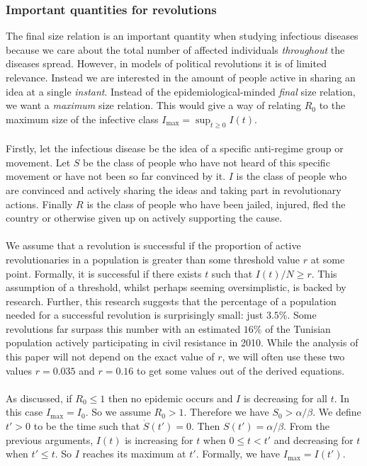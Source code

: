 \subsubsection{Important quantities for revolutions}
The final size relation is an important quantity when studying infectious diseases because we care about the total number of affected individuals \textit{throughout} the diseases spread. However, in models of political revolutions it is of limited relevance. Instead we are interested in the amount of people active in sharing an idea at a single \textit{instant}. Instead of the epidemiological-minded \textit{final} size relation, we want a \textit{maximum} size relation. This would give a way of relating $R_0$ to the maximum size of the infective class $I_{\max}=\sup_{t\geq0}I(t)$.\\
\\
Firstly, let the infectious disease be the idea of a specific anti-regime group or movement. Let $S$ be the class of people who have not heard of this specific movement or have not been so far convinced by it. $I$ is the class of people who are convinced and actively sharing the ideas and taking part in revolutionary actions. Finally $R$ is the class of people who have been jailed, injured, fled the country or otherwise given up on actively supporting the cause.\\
\\
We assume that a revolution is successful if the proportion of active revolutionaries in a population is greater than some threshold value $r$ at some point. Formally, it is successful if there exists $t$ such that ${I(t)}/{N}\geq r$. This assumption of a threshold, whilst perhaps seeming oversimplistic, is backed by research\cite{logic-non-violence}. Further, this research suggests that the percentage of a population needed for a successful revolution is surprisingly small: just $3.5\%$\cite{logic-non-violence}. Some revolutions far surpass this number with an estimated $16\%$ of the Tunisian population actively participating in civil resistance in 2010\cite{arab-spring-percent}. While the analysis of this paper will not depend on the exact value of $r$, we will often use these two values $r=0.035$ and $r=0.16$ to get some values out of the derived equations.\\
\\
As discussed, if $R_0\leq 1$ then no epidemic occurs and $I$ is decreasing for all $t$. In this case $I_{\max}=I_0$. So we assume $R_0>1$. Therefore we have $S_0>\alpha/\beta$. We define $t'>0$ to be the time such that $\dot S(t')=0$. Then $S(t')=\alpha/\beta$. From the previous arguments, $I(t)$ is increasing for $t$ when $0 \leq t<t'$ and decreasing for $t$ when $t'\leq t$. So $I$ reaches its maximum at $t'$. Formally, we have $I_{\max}=I(t')$.\\
